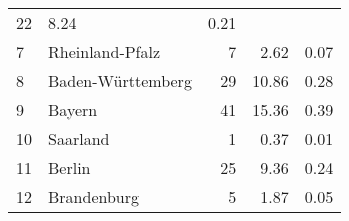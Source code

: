 \begin{longtable}{lXrrr}
       \num{22} &
       \num[round-mode=places,round-precision=2]{8,24} &
         \num[round-mode=places,round-precision=2]{0,21} \\

     7 &
     \multicolumn{1}{X}{ Rheinland-Pfalz   } &


       \num{7} &
       \num[round-mode=places,round-precision=2]{2,62} &
         \num[round-mode=places,round-precision=2]{0,07} \\

     8 &
     \multicolumn{1}{X}{ Baden-Württemberg   } &


       \num{29} &
       \num[round-mode=places,round-precision=2]{10,86} &
         \num[round-mode=places,round-precision=2]{0,28} \\

     9 &
     \multicolumn{1}{X}{ Bayern   } &


       \num{41} &
       \num[round-mode=places,round-precision=2]{15,36} &
         \num[round-mode=places,round-precision=2]{0,39} \\

     10 &
     \multicolumn{1}{X}{ Saarland   } &


       \num{1} &
       \num[round-mode=places,round-precision=2]{0,37} &
         \num[round-mode=places,round-precision=2]{0,01} \\

     11 &
     \multicolumn{1}{X}{ Berlin   } &


       \num{25} &
       \num[round-mode=places,round-precision=2]{9,36} &
         \num[round-mode=places,round-precision=2]{0,24} \\

     12 &
     \multicolumn{1}{X}{ Brandenburg   } &


       \num{5} &
       \num[round-mode=places,round-precision=2]{1,87} &
         \num[round-mode=places,round-precision=2]{0,05} \\


\end{longtable}
